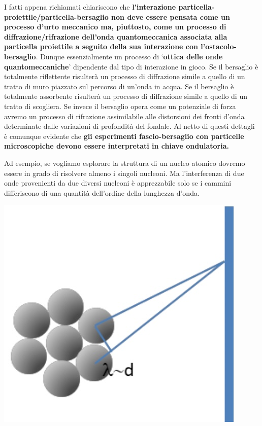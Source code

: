 I fatti appena richiamati chiariscono che \textbf{l'interazione
particella- proiettile/particella-bersaglio non deve essere pensata come
un processo d'urto meccanico ma, piuttosto, come un processo di
diffrazione/rifrazione dell'onda quantomeccanica associata alla
particella proiettile a seguito della sua interazione con
l'ostacolo-bersaglio}.
Dunque essenzialmente un processo di `\textbf{ottica delle onde quantomeccaniche}' dipendente dal tipo di
interazione in gioco.
Se il bersaglio è totalmente riflettente risulterà un processo di
diffrazione simile a quello di un tratto di muro piazzato sul percorso
di un'onda in acqua.
Se il bersaglio è totalmente assorbente risulterà
un processo di diffrazione simile a quello di un tratto di scogliera.
Se
invece il bersaglio opera come un potenziale di forza avremo un processo
di rifrazione assimilabile alle distorsioni dei fronti d'onda
determinate dalle variazioni di profondità del fondale.
Al netto di
questi dettagli è comunque evidente che \textbf{gli esperimenti
fascio-bersaglio con particelle microscopiche devono essere interpretati
in chiave ondulatoria.}

Ad esempio, se vogliamo esplorare la struttura di un nucleo atomico
dovremo essere in grado di risolvere almeno i singoli nucleoni.
Ma
l'interferenza di due onde provenienti da due diversi nucleoni è
apprezzabile solo se i cammini differiscono di una quantità dell'ordine
della lunghezza d'onda.
\begin{marginfigure}
	\includegraphics{figs/fascio-bersaglio-de-broglie}
	\label{fig:fascio-bersaglio-de-broglie}
\end{marginfigure}

